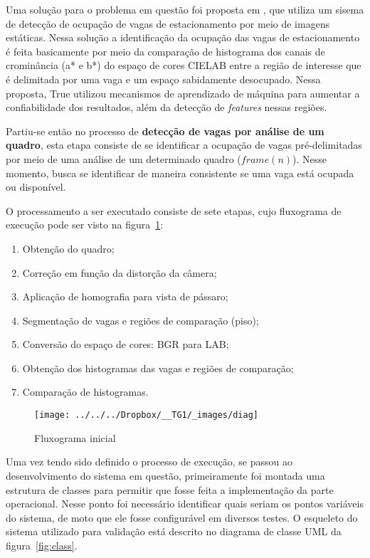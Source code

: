 \documentclass[ecp,tc]{iiufrgs}
\begin{document}
Uma solução para o problema em questão foi proposta em , que utiliza um sisema de detecção de ocupação de vagas de estacionamento por meio de imagens estáticas. Nessa solução a identificação da ocupação das vagas de estacionamento é feita basicamente por meio da comparação de histograma dos canais de crominância (a* e b*) do espaço de cores CIELAB entre a região de interesse que é delimitada por uma vaga e um espaço sabidamente desocupado. Nessa proposta, True utilizou mecanismos de aprendizado de máquina para aumentar a confiabilidade dos resultados, além da detecção de \textit{features} nessas regiões.

Partiu-se então no processo de \textbf{detecção de vagas por análise de um quadro}, esta etapa consiste de se identificar a ocupação de vagas pré-delimitadas por meio de uma análise de um determinado quadro ($ frame(n) $). Nesse momento, busca se identificar de maneira consistente se uma vaga está ocupada ou disponível.

O processamento a ser executado consiste de sete etapas, cujo fluxograma de execução pode ser visto na figura~\ref{fig:fluxo}:
\begin{enumerate}
	\item Obtenção do quadro;
	\item Correção em função da distorção da câmera;
	\item Aplicação de homografia para vista de pássaro;
	\item Segmentação de vagas e regiões de comparação (piso);
	\item Conversão do espaço de cores: BGR para LAB;
	\item Obtenção dos histogramas das vagas e regiões de comparação;
	\item Comparação de histogramas.
\end{enumerate}

\begin{figure}
	\centering
	\caption{Fluxograma inicial}
	\texttt{[image: ../../../Dropbox/\_\_TG1/\_images/diag]}
	\label{fig:fluxo}
\end{figure}

Uma vez tendo sido definido o processo de execução, se passou ao desenvolvimento do sistema em questão, primeiramente foi montada uma estrutura de classes para permitir que fosse feita a implementação da parte operacional. Nesse ponto foi necessário identificar quais seriam os pontos variáveis do sistema, de moto que ele fosse configurável em diversos testes. O esqueleto do sistema utilizado para validação está descrito no diagrama de classe UML da figura~\ref{fig:class}.
\end{document}
